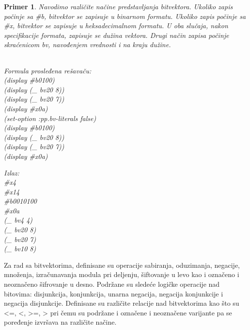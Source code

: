 \documentclass[12pt,oneside]{memoir}
\newtheorem{primer}{Primer}
\begin{document}
\begin{primer} Navodimo različite načine predstavljanja bitvektora. Ukoliko zapis počinje sa \#b, bitvektor se zapisuje u binarnom formatu. Ukoliko zapis počinje sa \#x, bitvektor se zapisuje u heksadecimalnom formatu. U oba slučaja, nakon specifikacije formata, zapisuje se dužina vektora. Drugi način zapisa počinje skraćenicom bv, navođenjem vrednosti i na kraju dužine. \\\\
\begin{minipage}[b]{0.4\textwidth}
Formula prosleđena rešavaču:
\\(display \#b0100)
\\(display (\_ bv20 8))
\\(display (\_ bv20 7))
\\(display \#x0a) 
\\(set-option :pp.bv-literals false)
\\(display \#b0100)
\\(display (\_ bv20 8))
\\(display (\_ bv20 7))
\\(display \#x0a)
\end{minipage}
\hspace{2.5cm}
\begin{minipage}[t]{0.4\textwidth}
\vspace{-5.9cm}
Izlaz:
\\\#x4 
\\\#x14 
\\\#b0010100 
\\\#x0a 
\\(\_ bv4 4) 
\\(\_ bv20 8) 
\\(\_ bv20 7) 
\\(\_ bv10 8)
\end{minipage}


\end{primer}


Za rad sa bitvektorima, definisane su operacije sabiranja, oduzimanja, negacije, množenja, izračunavanja modula pri deljenju, šiftovanje u levo kao i označeno i neoznačeno šifrovanje u desno. Podržane su sledeće logičke operacije nad bitovima: disjunkcija, konjunkcija, unarna negacija, negacija konjunkcije i negacija disjunkcije. Definisane su različite relacije nad bitvektorima kao što su <=, <, >=, > pri čemu su podržane i označene i neoznačene varijante pa se poređenje izvršava na različite načine. 
\end{document}

